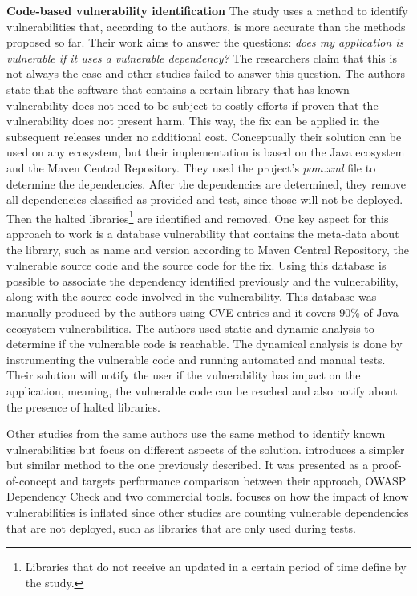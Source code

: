 \documentclass[pdf,bookmarks,colorlinks=true]{IEEEtran}
\begin{document}
\textbf{Code-based vulnerability identification}
The study \cite{Ponta2018} uses a method to identify vulnerabilities that, according to the authors, is more accurate than the methods proposed so far. Their work aims to answer the questions: {\em does my application is vulnerable if it uses a vulnerable dependency?} The researchers claim that this is not always the case and other studies failed to answer this question. The authors state that the software that contains a certain library that has known vulnerability does not need to be subject to costly efforts if proven that the vulnerability does not present harm. This way, the fix can be applied in the subsequent releases under no additional cost. Conceptually their solution can be used on any ecosystem, but their implementation is based on the Java ecosystem and the Maven Central Repository. They used the project’s {\em pom.xml} file to determine the dependencies. After the dependencies are determined, they remove all dependencies classified as provided and test, since those will not be deployed. Then the halted libraries\footnote{Libraries that do not receive an updated in a certain period of time define by the study.} are identified and removed. 
One key aspect for this approach to work is a database vulnerability that contains the meta-data about the library, such as name and version according to Maven Central Repository, the vulnerable source code and the source code for the fix. Using this database is possible to associate the dependency identified previously and the vulnerability, along with the source code involved in the vulnerability. This database was manually produced by the authors using CVE entries and it covers 90\% of Java ecosystem vulnerabilities.
The authors used static and dynamic analysis to determine if the vulnerable code is reachable. The dynamical analysis is done by instrumenting the vulnerable code and running automated and manual tests.
Their solution will notify the user if the vulnerability has impact on the application, meaning, the vulnerable code can be reached and also notify about the presence of halted libraries.

Other studies from the same authors use the same method to identify known vulnerabilities but focus on different aspects of the solution. \cite{Plate2015} introduces a simpler but similar method to the one previously described. It was presented as a proof-of-concept and targets performance comparison between their approach, OWASP Dependency Check and two commercial tools.  \cite{pashchenko2018esem} focuses on how the impact of know vulnerabilities is inflated since other studies are counting vulnerable dependencies that are not deployed, such as libraries that are only used during tests. 
\end{document}

